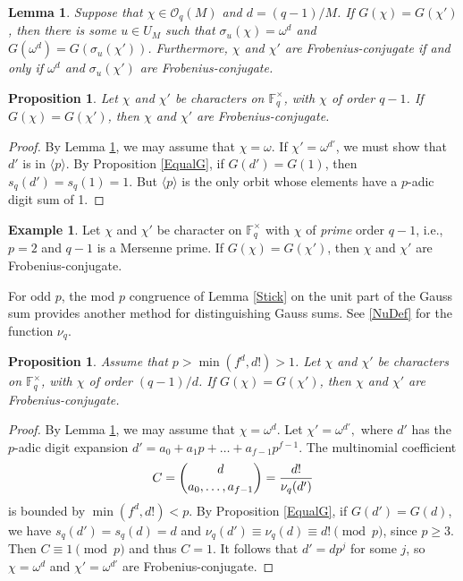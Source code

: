 \documentclass[12pt]{amsart}  \usepackage{amsmath,amssymb,enumerate,amscd,tikz,url}
\numberwithin{equation}{section}
\newtheorem{lemma}[equation]{Lemma}
\newtheorem{prop}[equation]{Proposition}
\theoremstyle{definition}
\newtheorem{Ex}[equation]{Example}
\newcommand{\F}{{\mathbb F}}
\newcommand{\cO}{{\mathcal O}}
\newcommand{\lr}[1]{{\langle {#1} \rangle}}
\begin{document}
\begin{lemma} \label{CleanUp}
Suppose that $\chi \in \cO_q(M)$ and $d = (q-1)/M$.  If $G(\chi) = G(\chi')$, then there is some $u \in U_M$ such that $\sigma_u(\chi) = \omega^d$ and $G(\omega^d) = G(\sigma_u(\chi'))$.  Furthermore, $\chi$ and $\chi'$ are Frobenius-conjugate if and only if $\omega^d$ and $\sigma_u(\chi')$ are Frobenius-conjugate.  
\end{lemma}

\begin{prop} \label{gcd1}
Let $\chi$ and $\chi'$ be characters on $\F_q^\times$, with $\chi$ of order $q-1$.  If $G(\chi) = G(\chi')$, then $\chi$ and $\chi'$ are Frobenius-conjugate.
\end{prop}

\begin{proof}
By Lemma \ref{CleanUp}, we may assume that $\chi = \omega$.  If $\chi' = \omega^{d'}$, we must show that $d'$ is in $\lr{p}$.  By Proposition \ref{EqualG}, if $G(d') = G(1)$, then $s_q(d') = s_q(1) = 1$.  But $\lr{p}$ is the only orbit whose elements have a $p$-adic digit sum of 1.
\end{proof}

\begin{Ex}\label{Mersenne}
Let $\chi$ and $\chi'$ be character on $\F_q^\times$ with $\chi$ of {\em prime} order $q-1$, i.e., $p=2$ and $q-1$ is a Mersenne prime.  If $G(\chi) = G(\chi')$, then $\chi$ and $\chi'$ are Frobenius-conjugate.
\end{Ex}

For odd $p$, the mod $p$ congruence of Lemma \ref{Stick} on the unit part of the Gauss sum provides another method for distinguishing Gauss sums.   See \eqref{NuDef} for the function $\nu_q$.

\begin{prop} \label{gcdd}
Assume that $p > \min(f^d,d!) > 1$.  Let $\chi$ and $\chi'$ be characters on $\F_q^\times$, with $\chi$ of order $(q-1)/d$.  If $G(\chi) = G(\chi')$, then $\chi$ and $\chi'$ are Frobenius-conjugate.  
\end{prop}

\begin{proof}
By Lemma \ref{CleanUp}, we may assume that $\chi = \omega^d$.  Let $\chi' = \omega^{d'}\!,$ where $d'$ has the $p$-adic digit expansion $d' = a_0 + a_1 p + \dots + a_{f-1}p^{f-1}$.  The multinomial coefficient 
\begin{equation} \label{UnitRatio}
C = \binom{d}{a_0, \dots, a_{f-1}} = \frac{d!}{\nu_q(d')}  \vspace{2 pt}
\end{equation}
is bounded by $\min(f^d,d!) < p$.   By Proposition \ref{EqualG}, if $G(d') = G(d)$, we have $s_q(d') = s_q(d) = d$ and $\nu_q(d') \equiv \nu_q(d) \equiv d! \pmod{p}$, since $p \ge 3$.  Then $C \equiv 1 \pmod{p}$ and thus $C = 1$.   It follows that $d' = dp^j$ for some $j$, so $\chi = \omega^d$ and $\chi' = \omega^{d'}$ are Frobenius-conjugate.   
\end{proof}
\end{document}
